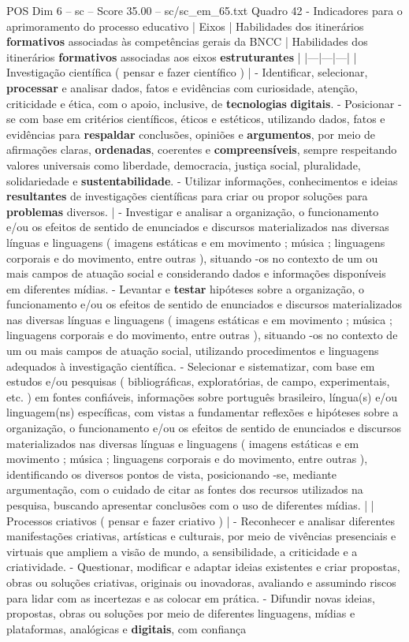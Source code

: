 \begin{textsample}{POS Dim 6 – sc – Score 35.00 – sc/sc\_em\_65.txt}
Quadro 42 - Indicadores para o aprimoramento do processo educativo | Eixos | Habilidades dos itinerários \textbf{formativos} associadas às competências gerais da BNCC | Habilidades dos itinerários \textbf{formativos} associadas aos eixos \textbf{estruturantes} | |---|---|---| | Investigação científica ( pensar e fazer científico ) | - Identificar, selecionar, \textbf{processar} e analisar dados, fatos e evidências com curiosidade, atenção, criticidade e ética, com o apoio, inclusive, de \textbf{tecnologias} \textbf{digitais}. - Posicionar -se com base em critérios científicos, éticos e estéticos, utilizando dados, fatos e evidências para \textbf{respaldar} conclusões, opiniões e \textbf{argumentos}, por meio de afirmações claras, \textbf{ordenadas}, coerentes e \textbf{compreensíveis}, sempre respeitando valores universais como liberdade, democracia, justiça social, pluralidade, solidariedade e \textbf{sustentabilidade}. - Utilizar informações, conhecimentos e ideias \textbf{resultantes} de investigações científicas para criar ou propor soluções para \textbf{problemas} diversos. | - Investigar e analisar a organização, o funcionamento e/ou os efeitos de sentido de enunciados e discursos materializados nas diversas línguas e linguagens ( imagens estáticas e em movimento ; música ; linguagens corporais e do movimento, entre outras ), situando -os no contexto de um ou mais campos de atuação social e considerando dados e informações disponíveis em diferentes mídias. - Levantar e \textbf{testar} hipóteses sobre a organização, o funcionamento e/ou os efeitos de sentido de enunciados e discursos materializados nas diversas línguas e linguagens ( imagens estáticas e em movimento ; música ; linguagens corporais e do movimento, entre outras ), situando -os no contexto de um ou mais campos de atuação social, utilizando procedimentos e linguagens adequados à investigação científica. - Selecionar e sistematizar, com base em estudos e/ou pesquisas ( bibliográficas, exploratórias, de campo, experimentais, etc. ) em fontes confiáveis, informações sobre português brasileiro, língua(s) e/ou linguagem(ns) específicas, com vistas a fundamentar reflexões e hipóteses sobre a organização, o funcionamento e/ou os efeitos de sentido de enunciados e discursos materializados nas diversas línguas e linguagens ( imagens estáticas e em movimento ; música ; linguagens corporais e do movimento, entre outras ), identificando os diversos pontos de vista, posicionando -se, mediante argumentação, com o cuidado de citar as fontes dos recursos utilizados na pesquisa, buscando apresentar conclusões com o uso de diferentes mídias. | | Processos criativos ( pensar e fazer criativo ) | - Reconhecer e analisar diferentes manifestações criativas, artísticas e culturais, por meio de vivências presenciais e virtuais que ampliem a visão de mundo, a sensibilidade, a criticidade e a criatividade. - Questionar, modificar e adaptar ideias existentes e criar propostas, obras ou soluções criativas, originais ou inovadoras, avaliando e assumindo riscos para lidar com as incertezas e as colocar em prática. - Difundir novas ideias, propostas, obras ou soluções por meio de diferentes linguagens, mídias e plataformas, analógicas e \textbf{digitais}, com confiança 
\end{textsample}
